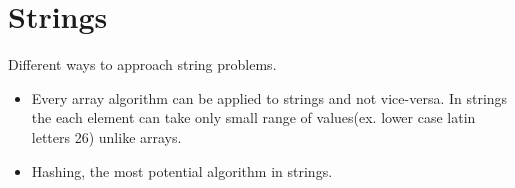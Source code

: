 \documentclass[../Notes.tex]{subfiles}
\begin{document}
\chapter{Strings}
Different ways to approach string problems.
\begin{itemize}
	\item Every array algorithm can be applied to strings and not vice-versa. In strings the each element can take only small range of values(ex. lower case latin letters 26) unlike arrays.
	\item Hashing, the most potential algorithm in strings.
\end{itemize}
\end{document}
